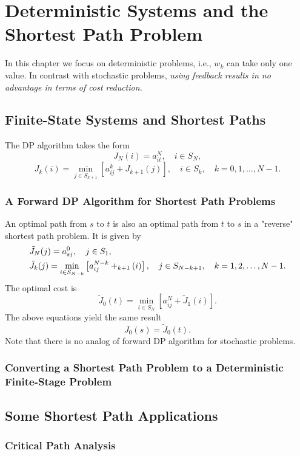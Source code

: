 \chapter{Deterministic Systems and the Shortest Path Problem}
In this chapter we focus on deterministic problems, i.e., $w_k$ can take only one value. In contrast with stochastic problems, \textit{using feedback results in no advantage in terms of cost reduction.} 

\section{Finite-State Systems and Shortest Paths}
The DP algorithm takes the form 
\begin{equation}
    J_N(i)=a_{it}^N,\quad i\in S_N,
\end{equation}
\begin{equation}
    J_k(i)=\min_{j\in S_{k+1}}\left[a_{ij}^k+J_{k+1}(j)\right],\quad i\in S_k,\quad k=0,1,\dots,N-1.
\end{equation}
\subsection*{A Forward DP Algorithm for Shortest Path Problems}
An optimal path from $s$ to $t$ is also an optimal path from $t$ to $s$ in a "reverse" shortest path problem. It is given by 
\begin{align}
    &\tilde{J}_N(j)=a_{sj}^0,\quad j\in S_1,\\
    &\tilde{J}_k(j)=\min_{i\in S_{N-k}}\left[a_{ij}^{N-k}+\title{J}_{k+1}(i)\right],\quad j\in S_{N-k+1},\quad k=1,2,\dots,N-1.
\end{align}
The optimal cost is 
\[\tilde{J}_0(t)=\min_{i\in S_N}\left[a_{ij}^N+\tilde{J}_1(i)\right].\]
The above equations yield the same result
\[J_0(s) =\tilde{J}_0(t).\]
Note that there is no analog of forward DP algorithm for stochastic problems.

\subsection*{Converting a Shortest Path Problem to a Deterministic Finite-Stage Problem}

\section{Some Shortest Path Applications}
\subsection{Critical Path Analysis}

